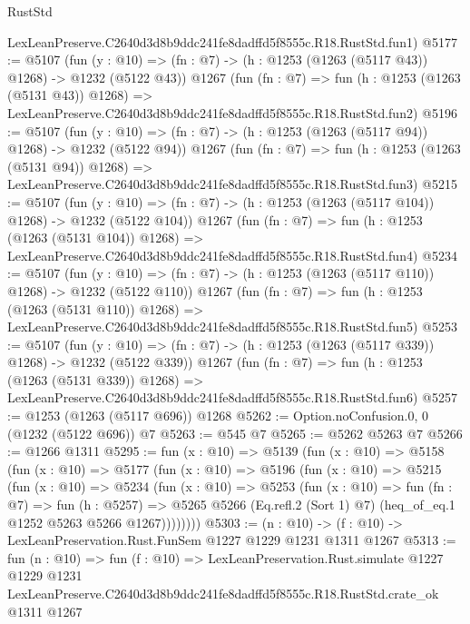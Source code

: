 \begin{lexlean}{RustStd}
\begin{coremodule}
    LexLeanPreserve.C2640d3d8b9ddc241fe8dadffd5f8555c.R18.RustStd.fun1)
@5177 := @5107
    (fun (y : @10) => (fn : @7) -> (h : @1253 (@1263 (@5117 @43)) @1268) -> @1232 (@5122 @43))
    @1267
    (fun (fn : @7) =>
    fun (h : @1253 (@1263 (@5131 @43)) @1268) =>
    LexLeanPreserve.C2640d3d8b9ddc241fe8dadffd5f8555c.R18.RustStd.fun2)
@5196 := @5107
    (fun (y : @10) => (fn : @7) -> (h : @1253 (@1263 (@5117 @94)) @1268) -> @1232 (@5122 @94))
    @1267
    (fun (fn : @7) =>
    fun (h : @1253 (@1263 (@5131 @94)) @1268) =>
    LexLeanPreserve.C2640d3d8b9ddc241fe8dadffd5f8555c.R18.RustStd.fun3)
@5215 := @5107
    (fun (y : @10) => (fn : @7) -> (h : @1253 (@1263 (@5117 @104)) @1268) -> @1232 (@5122 @104))
    @1267
    (fun (fn : @7) =>
    fun (h : @1253 (@1263 (@5131 @104)) @1268) =>
    LexLeanPreserve.C2640d3d8b9ddc241fe8dadffd5f8555c.R18.RustStd.fun4)
@5234 := @5107
    (fun (y : @10) => (fn : @7) -> (h : @1253 (@1263 (@5117 @110)) @1268) -> @1232 (@5122 @110))
    @1267
    (fun (fn : @7) =>
    fun (h : @1253 (@1263 (@5131 @110)) @1268) =>
    LexLeanPreserve.C2640d3d8b9ddc241fe8dadffd5f8555c.R18.RustStd.fun5)
@5253 := @5107
    (fun (y : @10) => (fn : @7) -> (h : @1253 (@1263 (@5117 @339)) @1268) -> @1232 (@5122 @339))
    @1267
    (fun (fn : @7) =>
    fun (h : @1253 (@1263 (@5131 @339)) @1268) =>
    LexLeanPreserve.C2640d3d8b9ddc241fe8dadffd5f8555c.R18.RustStd.fun6)
@5257 := @1253 (@1263 (@5117 @696)) @1268
@5262 := Option.noConfusion.{0, 0} (@1232 (@5122 @696)) @7
@5263 := @545 @7
@5265 := @5262 @5263 @7
@5266 := @1266 @1311
@5295 := fun (x : @10) =>
  @5139
    (fun (x : @10) =>
    @5158
      (fun (x : @10) =>
      @5177
        (fun (x : @10) =>
        @5196
          (fun (x : @10) =>
          @5215
            (fun (x : @10) =>
            @5234
              (fun (x : @10) =>
              @5253
                (fun (x : @10) =>
                fun (fn : @7) =>
                fun (h : @5257) =>
                @5265 @5266 (Eq.refl.{2} (Sort 1) @7) (heq_of_eq.{1} @1252 @5263 @5266 @1267))))))))
@5303 := (n : @10) -> (f : @10) -> LexLeanPreservation.Rust.FunSem @1227 @1229 @1231 @1311 @1267
@5313 := fun (n : @10) =>
  fun (f : @10) =>
  LexLeanPreservation.Rust.simulate
    @1227
    @1229
    @1231
    LexLeanPreserve.C2640d3d8b9ddc241fe8dadffd5f8555c.R18.RustStd.crate_ok
    @1311
    @1267
\end{coremodule}
\end{lexlean}
